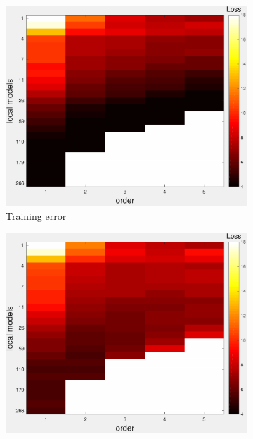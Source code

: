 \documentclass[letterpaper, 10 pt, conference]{ieeeconf}  %
\begin{document}
 \begin{figure}[thpb]
        \centering
        \begin{subfigure}[b]{1in} 
                \centering
                \includegraphics[width=\textwidth]{figures/cross_allQP1.pdf}
                \caption{Training error}
                \label{fig:crossval_train}
        \end{subfigure}
                \begin{subfigure}[b]{1in} 
                \centering
                \includegraphics[width=\textwidth]{figures/cross_allQP2.pdf}

\end{subfigure}
\end{figure}
\end{document}
